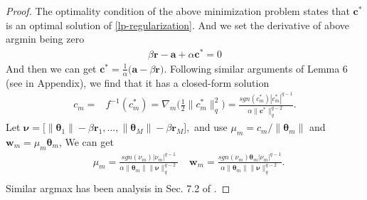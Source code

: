 \documentclass{article}
\newtheorem{lemma}{Lemma}
\begin{document}
\begin{proof}
The optimality condition of the above minimization problem \cite{rockafellar2015convex} states that $\pmb{c}^\ast$ is an optimal solution of \eqref{lp-regularization}. And we set the derivative of above argmin being zero
\begin{align}
    \label{l2-regularization-subgradient}
        \beta\mathbf{r}-\mathbf{a}+\alpha\pmb{c}^\ast=0
\end{align}
And then we can get $\pmb{c}^\ast=\frac{1}{\alpha}\Big(\mathbf{a}-\beta\mathbf{r}\Big)$.
Following similar arguments of Lemma 6 (see in Appendix), we find that it has a closed-form solution
\begin{align*}
    c_m=&f ^{-1}(c_m^\ast)=\nabla_m\Big(\frac{1}{2}\|{c}_m^\ast\|_q^2\Big)
    =\frac{sgn({c}_m^\ast)|{c}_m^\ast|^{q-1}}{\alpha\|\pmb{c}^\ast\|_q^{q-2}}.
\end{align*}
Let
$
    \bm \nu=\Big[\|\pmb{\theta}_1\|-\beta\mathbf{r}_1,\ldots,
    \|\pmb{\theta}_M\|-\beta\mathbf{r}_M\Big],
$
and use $\mu_m=c_m/\|\pmb{\theta}_m\|$ and $\mathbf w_m=\mu_m\pmb{\theta}_m$, We can get
\begin{align*}
    &{\mu}_m=\frac{sgn(\nu_m)|\nu_m|^{q-1}}{\alpha\|\pmb{\theta}_m\|\|\bm \nu\|_q^{q-2}}\;
    &\mathbf w_m=\frac{sgn(\nu_m)\pmb{\theta}_m|\nu_m|^{q-1}}{\alpha\|\pmb{\theta}_m\|\|\bm \nu\|_q^{q-2}}.\\
\end{align*}
Similar argmax has been analysis in Sec. 7.2 of \cite{Xiao10}.
\end{proof}

\end{document}
